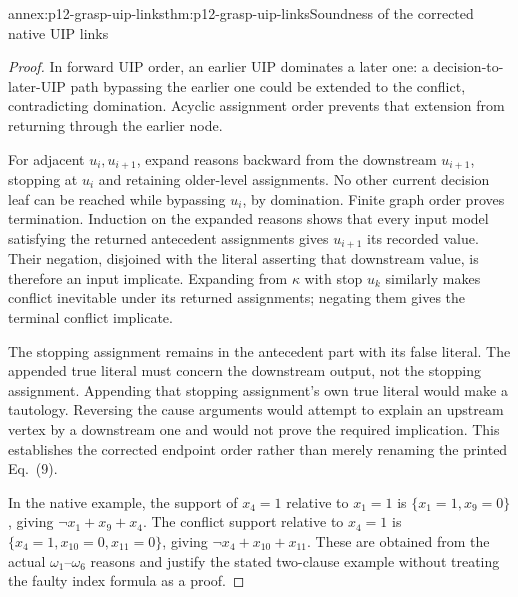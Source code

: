 \begin{annexitem}{annex:p12-grasp-uip-links}{thm:p12-grasp-uip-links}{Soundness of the corrected native UIP links}
\begin{proof}
In forward UIP order, an earlier UIP dominates a later one: a decision-to-
later-UIP path bypassing the earlier one could be extended to the conflict,
contradicting domination.  Acyclic assignment order prevents that extension
from returning through the earlier node.

For adjacent \(u_i,u_{i+1}\), expand reasons backward from the downstream
\(u_{i+1}\), stopping at \(u_i\) and retaining older-level assignments.
No other current decision leaf can be reached while bypassing \(u_i\),
by domination.  Finite graph order proves termination.  Induction on the
expanded reasons shows that every input model satisfying the returned
antecedent assignments gives \(u_{i+1}\) its recorded value.  Their
negation, disjoined with the literal asserting that downstream value, is
therefore an input implicate.  Expanding from \(\kappa\) with stop \(u_k\)
similarly makes conflict inevitable under its returned assignments; negating
them gives the terminal conflict implicate.

The stopping assignment remains in the antecedent part with its false
literal.  The appended true literal must concern the downstream output,
not the stopping assignment.  Appending that stopping assignment's own
true literal would make a tautology.  Reversing the cause arguments would
attempt to explain an upstream vertex by a downstream one and would not
prove the required implication.  This establishes the corrected endpoint
order rather than merely renaming the printed Eq.~(9).

In the native example, the support of \(x_4=1\) relative to \(x_1=1\)
is \(\{x_1=1,x_9=0\}\), giving \(\neg x_1+x_9+x_4\).
The conflict support relative to \(x_4=1\) is
\(\{x_4=1,x_{10}=0,x_{11}=0\}\), giving
\(\neg x_4+x_{10}+x_{11}\).  These are obtained from the actual
\(\omega_1\)--\(\omega_6\) reasons and justify the stated two-clause
example without treating the faulty index formula as a proof.
\end{proof}
\end{annexitem}

